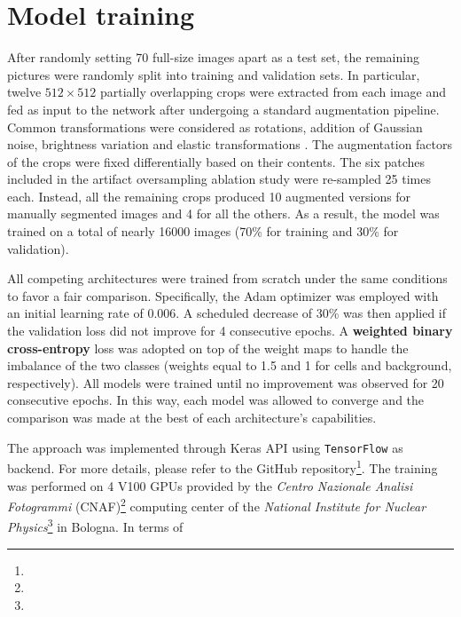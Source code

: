 \section{Model training}
\label{sec:model_training}

After randomly setting 70 full-size images apart as a test set, the remaining pictures were randomly split into training and validation sets. 
In particular, twelve $512\times512$ partially overlapping crops were extracted from each image and fed as input to the network after undergoing a standard augmentation pipeline. Common transformations were considered as rotations, addition of Gaussian noise, brightness variation and elastic transformations \cite{elastic_tranformation}. 
The augmentation factors of the crops were fixed differentially based on their contents. 
The six patches included in the artifact oversampling ablation study were re-sampled 25 times each.
Instead, all the remaining crops produced 10 augmented versions for manually segmented images and 4 for all the others.
As a result, the model was trained on a total of nearly 16000 images (70\% for training and 30\% for validation).

All competing architectures were trained from scratch under the same conditions to favor a fair comparison.
Specifically, the Adam \cite{adam} optimizer was employed with an initial learning rate of 0.006. A scheduled decrease of 30\% was then applied if the validation loss did not improve for 4 consecutive epochs. 
A \textbf{weighted binary cross-entropy} loss was adopted on top of the weight maps to handle the imbalance of the two classes (weights equal to 1.5 and 1 for cells and background, respectively).
All models were trained until no improvement was observed for 20 consecutive epochs. In this way, each model was allowed to converge and the comparison was made at the best of each architecture's capabilities.

The approach was implemented through Keras API \cite{keras} using \texttt{TensorFlow} \cite{tensorflow} as backend. For more details, please refer to the GitHub repository\footnote{\github}.
The training was performed on 4 V100 GPUs provided by the \textit{Centro Nazionale Analisi Fotogrammi} (CNAF)\footnote{\cnaf} computing center of the \textit{National Institute for Nuclear Physics}\footnote{\infn} in Bologna.
In terms of 